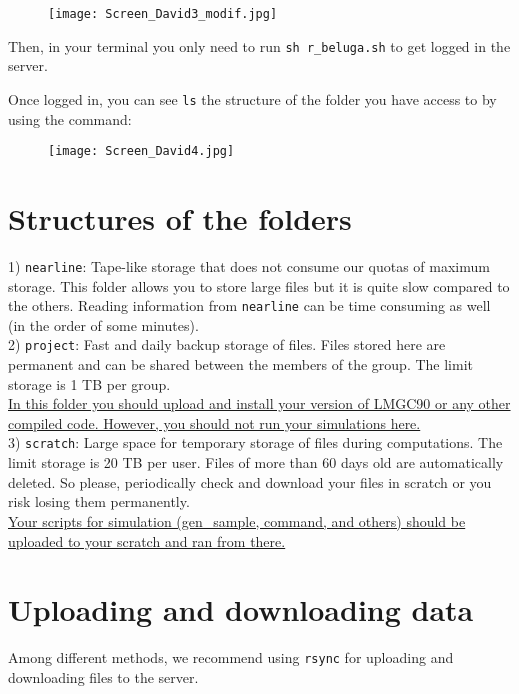 \documentclass[12pt]{article}
\begin{document}
\begin{figure}[H]
  \texttt{[image: Screen\_David3\_modif.jpg]}
\end{figure}

Then, in your terminal you only need to run \texttt{sh r\_beluga.sh} to get logged in the server.

Once logged in, you can see \texttt{ls} the structure of the folder you have access to by using the command:
\begin{figure}[H]
  \texttt{[image: Screen\_David4.jpg]}
\end{figure}


\section*{Structures of the folders}
    
    1) \texttt{nearline}: Tape-like storage that does not consume our quotas of maximum storage. This folder allows you to store large files but it is quite slow compared to the others. Reading information from \texttt{nearline} can be time consuming as well (in the order of some minutes). \\
    
    2) \texttt{project}: Fast and daily backup storage of files. Files stored here are permanent and can be shared between the members of the group. The limit storage is 1 TB per group. \\ \break
    \uline{In this folder you should upload and install your version of LMGC90 or any other compiled code. However, you should not run your simulations here.} \\

    3) \texttt{scratch}: Large space for temporary storage of files during computations. The limit storage is 20 TB per user.
    Files of more than 60 days old are automatically deleted. So please, periodically check and download your files in scratch or you risk losing them permanently. \\ \break
    \uline{Your scripts for simulation (gen\_sample, command, and others) should be uploaded to your scratch and ran from there.}


\section*{Uploading and downloading data}
Among different methods, we recommend using \texttt{rsync} for uploading and downloading files to the server.
\end{document}
